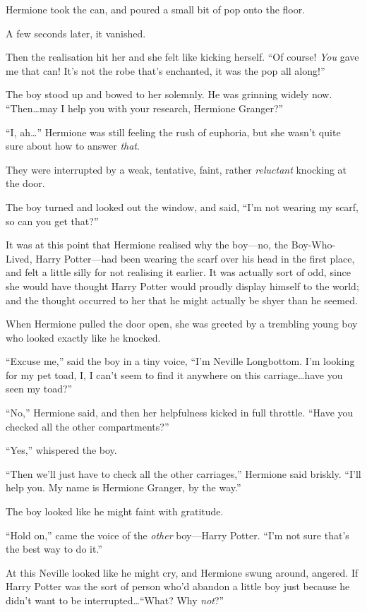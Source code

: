 Hermione took the can, and poured a small bit of pop onto the floor.

A few seconds later, it vanished.

Then the realisation hit her and she felt like kicking herself. “Of course! \emph{You} gave me that can! It’s not the robe that’s enchanted, it was the pop all along!”

The boy stood up and bowed to her solemnly. He was grinning widely now. “Then…may I help you with your research, Hermione Granger?”

“I, ah…” Hermione was still feeling the rush of euphoria, but she wasn’t quite sure about how to answer \emph{that}.

They were interrupted by a weak, tentative, faint, rather \emph{reluctant} knocking at the door.

The boy turned and looked out the window, and said, “I’m not wearing my scarf, so can you get that?”

It was at this point that Hermione realised why the boy—no, the Boy-Who-Lived, Harry Potter—had been wearing the scarf over his head in the first place, and felt a little silly for not realising it earlier. It was actually sort of odd, since she would have thought Harry Potter would proudly display himself to the world; and the thought occurred to her that he might actually be shyer than he seemed.

When Hermione pulled the door open, she was greeted by a trembling young boy who looked exactly like he knocked.

“Excuse me,” said the boy in a tiny voice, “I’m Neville Longbottom. I’m looking for my pet toad, I, I can’t seem to find it anywhere on this carriage…have you seen my toad?”

“No,” Hermione said, and then her helpfulness kicked in full throttle. “Have you checked all the other compartments?”

“Yes,” whispered the boy.

“Then we’ll just have to check all the other carriages,” Hermione said briskly. “I’ll help you. My name is Hermione Granger, by the way.”

The boy looked like he might faint with gratitude.

“Hold on,” came the voice of the \emph{other} boy—Harry Potter. “I’m not sure that’s the best way to do it.”

At this Neville looked like he might cry, and Hermione swung around, angered. If Harry Potter was the sort of person who’d abandon a little boy just because he didn’t want to be interrupted…“What? Why \emph{not}?”

